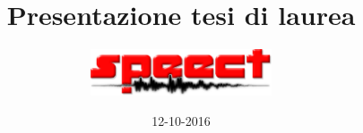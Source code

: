 \documentclass[]{beamer}
\title{Presentazione tesi di laurea}
\author[Giovanni Mazzocchin]{\includegraphics[width=0.4\textwidth]{speect_logo_full.png}}
\date{12-10-2016}
\institute{Relazione di stage}
\begin{document}
\graphicspath{ {res/img/} }



\end{document}
